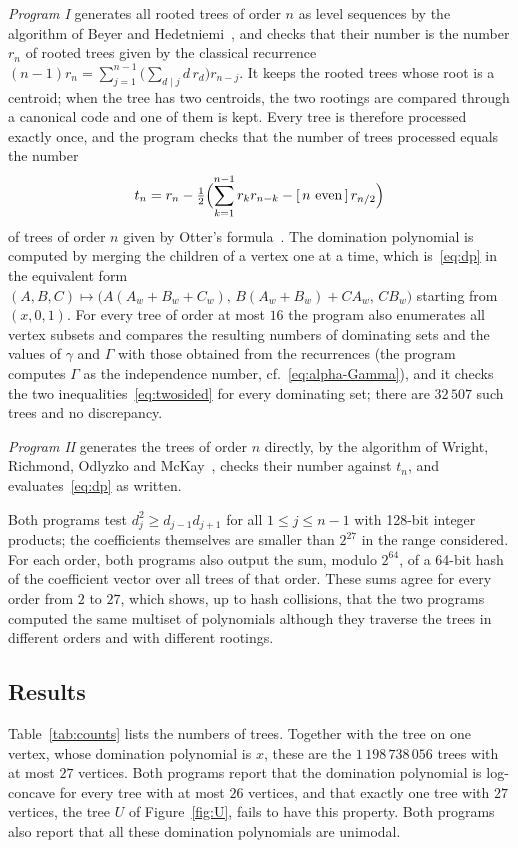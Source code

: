 \documentclass[smallextended,envcountsect,envcountsame]{svjour3}
\newcommand{\MaxLC}{26}
\newcommand{\MinNonLC}{27}
\newcommand{\MaxOrder}{27}
\newcommand{\TotalTreesAll}{1\,198\,738\,056}
\begin{document}
\begin{appendices}
\emph{Program I} generates all rooted trees of order $n$ as level sequences
by the algorithm of Beyer and Hedetniemi~\cite{BH}, and checks that their
number is the number $r_n$ of rooted trees given by the classical recurrence
$(n-1)r_n=\sum_{j=1}^{n-1}\bigl(\sum_{d\mid j}d\,r_d\bigr)r_{n-j}$. It
keeps the rooted trees whose root is a centroid; when the tree has two
centroids, the two rootings are compared through a canonical code and one of
them is kept. Every tree is therefore processed exactly once, and the program
checks that the number of trees processed equals the number
\begingroup\small\[
  t_n=r_n-\tfrac12\Bigl(\sum_{k=1}^{n-1}r_kr_{n-k}-[\,n\text{ even}\,]\,r_{n/2}\Bigr)
\]\endgroup
of trees of order $n$ given by Otter's formula~\cite{Otter}. The domination
polynomial is computed by merging the children of a vertex one at a time,
which is~\eqref{eq:dp} in the equivalent form
$(A,B,C)\mapsto\bigl(A(A_w+B_w+C_w),\,B(A_w+B_w)+CA_w,\,CB_w\bigr)$ starting
from $(x,0,1)$. For every tree of order at most $16$ the program also
enumerates all vertex subsets and compares the resulting numbers of
dominating sets and the values of $\gamma$ and $\Gamma$ with those obtained
from the recurrences (the program computes $\Gamma$ as the independence
number, cf.~\eqref{eq:alpha-Gamma}), and it checks the two
inequalities~\eqref{eq:twosided} for every dominating set; there are $32\,507$ such trees and no
discrepancy.

\emph{Program II} generates the trees of order $n$ directly, by the
algorithm of Wright, Richmond, Odlyzko and McKay~\cite{WROM}, checks their
number against $t_n$, and evaluates~\eqref{eq:dp} as written.

Both programs test $d_j^2\ge d_{j-1}d_{j+1}$ for all $1\le j\le n-1$ with
128-bit integer products; the coefficients themselves are smaller than
$2^{27}$ in the range considered. For each order, both programs also output the
sum, modulo $2^{64}$, of a 64-bit hash of the coefficient vector over all
trees of that order. These sums agree for every order from $2$ to $\MaxOrder$,
which shows, up to hash collisions, that the two programs computed the same
multiset of polynomials although they traverse the trees in different orders
and with different rootings.

\subsection*{Results}
Table~\ref{tab:counts} lists the numbers of trees. Together with the tree on
one vertex, whose domination polynomial is $x$, these are the $\TotalTreesAll$
trees with at most $\MaxOrder$ vertices. Both programs report
that the domination polynomial is log-concave for every tree with at most
$\MaxLC$ vertices, and that exactly one tree with $\MinNonLC$ vertices, the
tree $U$ of Figure~\ref{fig:U}, fails to have this property. Both programs
also report that all these domination polynomials are unimodal.


\end{appendices}
\end{document}
